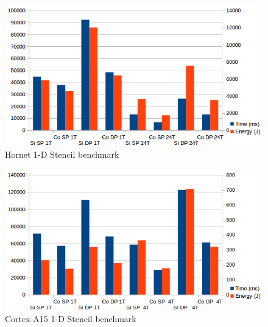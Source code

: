 \documentclass{acm_proc_article-sp}
\begin{document}
\begin{figure}[ht!]
  \centering
  \includegraphics[scale=0.5]{results/Hornet-1D}
  \caption{Hornet 1-D Stencil benchmark}
  \label{pic:hornet-1d}
\end{figure}

\begin{figure}[ht!]
  \centering
  \includegraphics[scale=0.5]{results/A15-1D}
  \caption{Cortex-A15 1-D Stencil benchmark}
  \label{pic:A15-1d}
\end{figure}
\end{document}

